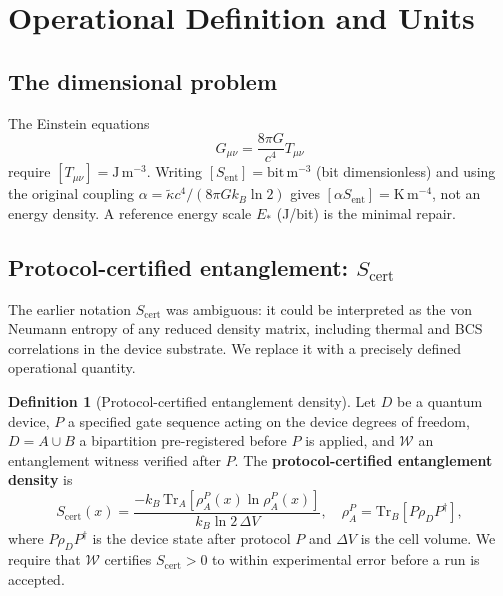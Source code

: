 \documentclass[11pt]{article}
\theoremstyle{plain}
\theoremstyle{definition}
\newtheorem{definition}{Definition}[section]
\theoremstyle{remark}
\begin{document}
\section{Operational Definition and Units}

\subsection{The dimensional problem}

The Einstein equations
\begin{equation}
G_{\mu\nu} = \frac{8\pi G}{c^4} T_{\mu\nu}
\end{equation}
require $[T_{\mu\nu}] = \mathrm{J\,m^{-3}}$.  Writing $[S_{\mathrm{ent}}] = \mathrm{bit\,m^{-3}}$
(bit dimensionless) and using the original coupling $\alpha = \tilde{\kappa}c^4/(8\pi Gk_B\ln 2)$
gives $[\alpha S_{\mathrm{ent}}] = \mathrm{K\,m^{-4}}$, not an energy density.  A reference energy
scale $E_*$ (J/bit) is the minimal repair.

\subsection{Protocol-certified entanglement: \texorpdfstring{$S_{\mathrm{cert}}$}{Scert}}
\label{sec:Scert}

The earlier notation $S_{\mathrm{cert}}$ was ambiguous: it could be interpreted as the von Neumann
entropy of any reduced density matrix, including thermal and BCS correlations in the device
substrate.  We replace it with a precisely defined operational quantity.

\begin{definition}[Protocol-certified entanglement density]
Let $D$ be a quantum device, $P$ a specified gate sequence
acting on the device degrees of freedom, $D = A\cup B$ a bipartition pre-registered before
$P$ is applied, and $\mathcal{W}$ an entanglement witness verified after $P$.
The \textbf{protocol-certified entanglement density} is
\begin{equation}
S_{\mathrm{cert}}(x)
= \frac{-k_B\,\mathrm{Tr}_A\!\left[\rho_A^P(x)\ln\rho_A^P(x)\right]}{k_B\ln 2\,\Delta V},
\quad
\rho_A^P = \mathrm{Tr}_B\!\left[P\rho_D P^\dagger\right],
\label{eq:Scert}
\end{equation}
where $P\rho_D P^\dagger$ is the device state after protocol $P$ and $\Delta V$ is the cell
volume.  We require that $\mathcal{W}$ certifies $S_{\mathrm{cert}} > 0$ to within
experimental error before a run is accepted.
\end{definition}
\end{document}
